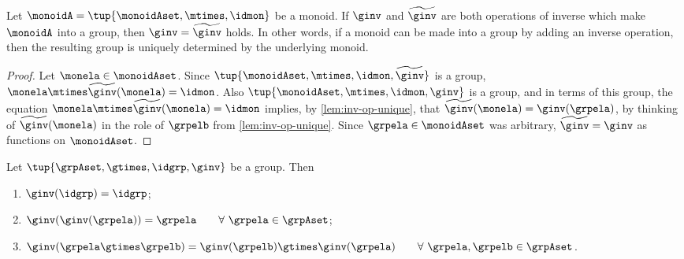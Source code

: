 \begin{corollary}
 \label{cor:inv-op-unique}
Let $\monoidA = \tup{\monoidAset, \mtimes,  \idmon }$ be a monoid. If $\ginv$ and $\widetilde \ginv$ are both operations of inverse which make $\monoidA$ into a group, then $\ginv = \widetilde \ginv$ holds. In other words, if a monoid can be made into a group by adding an inverse operation, then the resulting group is uniquely determined by the underlying monoid. 
\end{corollary}

\begin{proof}
Let $\monela \in \monoidAset$. 
Since $\tup{\monoidAset, \mtimes,  \idmon, \widetilde \ginv }$ is a group, $\monela \mtimes  \widetilde \ginv(\monela) = \idmon$. Also $\tup{\monoidAset, \mtimes,  \idmon, \ginv }$ is a group, and in terms of this group, the equation $\monela \mtimes  \widetilde \ginv(\monela) = \idmon$ implies, by \cref{lem:inv-op-unique}, that $\widetilde \ginv(\monela) = \ginv(\grpela)$, by thinking of $\widetilde \ginv(\monela)$ in the role of $\grpelb$ from \cref{lem:inv-op-unique}. Since $\grpela \in \monoidAset$ was arbitrary, $\widetilde \ginv = \ginv$ as functions on $\monoidAset$.  
\end{proof}


\begin{lemma}
  \label{lem:inv-op-properties}
  Let $\tup{\grpAset, \gtimes, \idgrp, \ginv}$ be a group. Then
  \begin{enumerate}
    \item\label{eq:group-neutral-invariant} $\ginv(\idgrp) = \idgrp$;
    \item\label{eq:group-inverse-inverse}  $ \ginv(\ginv(\grpela)) = \grpela \quad \quad \forall \  \grpela \in \grpAset$;
    \item\label{eq:group-inverse-of-composition} $\ginv(\grpela \gtimes \grpelb ) = \ginv(\grpelb) \gtimes \ginv(\grpela) \quad \quad \forall \ \grpela, \grpelb \in \grpAset$.
  \end{enumerate}
\end{lemma}

